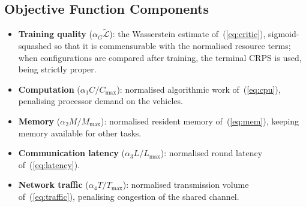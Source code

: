\documentclass[journal]{IEEEtran}
\begin{document}
\subsection{Objective Function Components}
\begin{itemize}
\item \textbf{Training quality} ($\alpha_G\tilde{\mathcal{L}}$): the Wasserstein
      estimate of~(\ref{eq:critic}), sigmoid-squashed so that it is
      commensurable with the normalised resource terms; when configurations are
      compared after training, the terminal CRPS is used, being strictly proper.
\item \textbf{Computation} ($\alpha_1C/C_{\max}$): normalised algorithmic work
      of~(\ref{eq:cpu}), penalising processor demand on the vehicles.
\item \textbf{Memory} ($\alpha_2M/M_{\max}$): normalised resident memory
      of~(\ref{eq:mem}), keeping memory available for other tasks.
\item \textbf{Communication latency} ($\alpha_3L/L_{\max}$): normalised round
      latency of~(\ref{eq:latency}).
\item \textbf{Network traffic} ($\alpha_4T/T_{\max}$): normalised transmission
      volume of~(\ref{eq:traffic}), penalising congestion of the shared channel.
\end{itemize}
\end{document}
